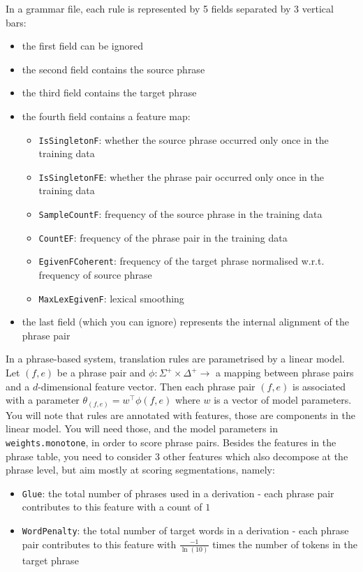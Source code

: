 In a grammar file, each rule is represented by 5 fields separated by 3 vertical bars:

\begin{itemize}
	\item the first field can be ignored
	\item the second field contains the source phrase
	\item the third field contains the target phrase
	\item the fourth field contains a feature map:
		\begin{itemize}
			\item \texttt{IsSingletonF}: whether the source phrase occurred only once in the training data
			\item \texttt{IsSingletonFE}: whether the phrase pair occurred only once in the training data
			\item \texttt{SampleCountF}: frequency of the source phrase in the training data 
			\item \texttt{CountEF}: frequency of the phrase pair in the training data 
			\item \texttt{EgivenFCoherent}: frequency of the target phrase normalised w.r.t. frequency of source phrase
			\item \texttt{MaxLexEgivenF}: lexical smoothing
		\end{itemize}
	\item the last field (which you can ignore) represents the internal alignment of the phrase pair
\end{itemize}

In a phrase-based system, translation rules are parametrised by a linear model.
Let $(f, e)$ be a phrase pair and $\phi: \Sigma^+ \times \Delta^+ \to$ a mapping between phrase pairs and a $d$-dimensional feature vector.
Then each phrase pair $(f,e)$ is associated with a parameter $\theta_{(f,e)} = w^\top \phi(f,e)$ where $w$ is a vector of model parameters.
You will note that rules are annotated with features, those are components in the linear model. You will need those, and the model parameters in \texttt{weights.monotone}, in order to score phrase pairs. 
Besides the features in the phrase table, you need to consider 3 other features which also decompose at the phrase level, but aim mostly at scoring segmentations, namely:
\begin{itemize}
	\item \texttt{Glue}: the total number of phrases used in a derivation - each phrase pair contributes to this feature with a count of $1$
	\item \texttt{WordPenalty}: the total number of target words in a derivation - each phrase pair contributes to this feature with $\frac{-1}{\ln(10)}$ times the number of tokens in the target phrase 
\end{itemize}

